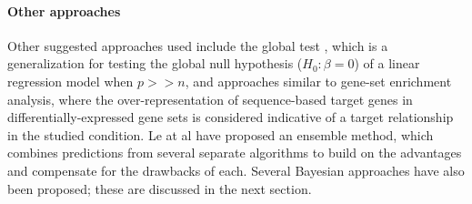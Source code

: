 \paragraph{Other approaches}
Other suggested approaches used include the global test \citep{vanIterson2013}, which is a
generalization for testing the global null hypothesis ($H_0: \beta = 0$) of a
linear regression model when $p >> n$, and approaches
similar to gene-set enrichment analysis, where the over-representation of
sequence-based target genes in differentially-expressed gene sets is considered
indicative of a target relationship in the studied condition. Le at al \citep{Le2015}
have proposed an ensemble
method, which combines predictions from several separate algorithms to build
on the advantages and compensate for the drawbacks of each.
Several Bayesian approaches have also been proposed; these are discussed in
the next section.





